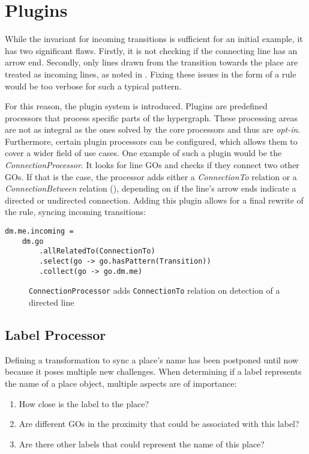 \section{Plugins}
\label{sec:plugins}
While the invariant for incoming transitions is sufficient for an initial example, it has two significant flaws. Firstly, it is not checking if the connecting line has an arrow end. Secondly, only lines drawn from the transition towards the place are treated as incoming lines, as noted in . Fixing these issues in the form of a rule would be too verbose for such a typical pattern.

For this reason, the plugin system is introduced. Plugins are predefined processors that process specific parts of the hypergraph. These processing areas are not as integral as the ones solved by the core processors and thus are \emph{opt-in}. Furthermore, certain plugin processors can be configured, which allows them to cover a wider field of use cases. One example of such a plugin would be the \emph{ConnectionProcessor}. It looks for line GOs and checks if they connect two other GOs. If that is the case, the processor adds either a \emph{ConnectionTo} relation or a \emph{ConnectionBetween} relation (), depending on if the line's arrow ends indicate a directed or undirected connection. Adding this plugin allows for a final rewrite of the rule, syncing incoming transitions:

\begin{lstlisting}[captionpos=b,caption={Final iteration of the place incoming transition rule}]
dm.me.incoming = 
    dm.go
        .allRelatedTo(ConnectionTo)
        .select(go -> go.hasPattern(Transition))
        .collect(go -> go.dm.me)
\end{lstlisting}

\begin{figure}[ht]
  \centering
  
  \caption{\texttt{ConnectionProcessor} adds \texttt{ConnectionTo} relation on detection of a directed line}
  \label{fig:transition-plugin}
\end{figure}



\subsection{Label Processor}
Defining a transformation to sync a place's name has been postponed until now because it poses multiple new challenges. When determining if a label represents the name of a place object, multiple aspects are of importance:
\begin{enumerate}
  \item How close is the label to the place?
  \item Are different GOs in the proximity that could be associated with this label?
  \item Are there other labels that could represent the name of this place?
\end{enumerate}

